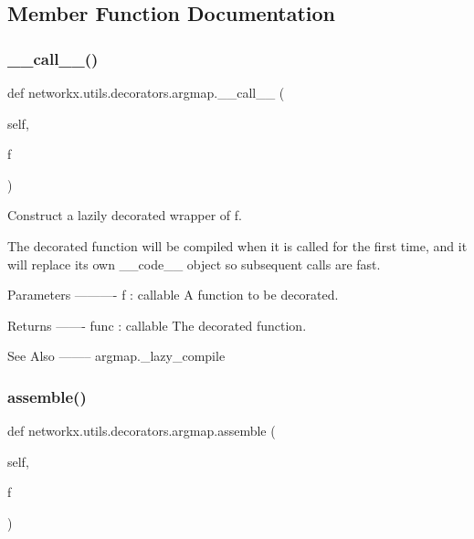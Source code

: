 \subsection{Member Function Documentation}
\mbox{\label{classnetworkx_1_1utils_1_1decorators_1_1argmap_abaf304b244dda496203fcbd471fec103}} 
\subsubsection{\texorpdfstring{\+\_\+\+\_\+call\+\_\+\+\_\+()}{\_\_call\_\_()}}
{\footnotesize\ttfamily def networkx.\+utils.\+decorators.\+argmap.\+\_\+\+\_\+call\+\_\+\+\_\+ (\begin{DoxyParamCaption}\item[{}]{self,  }\item[{}]{f }\end{DoxyParamCaption})}

\begin{DoxyVerb}Construct a lazily decorated wrapper of f.

The decorated function will be compiled when it is called for the first time,
and it will replace its own __code__ object so subsequent calls are fast.

Parameters
----------
f : callable
    A function to be decorated.

Returns
-------
func : callable
    The decorated function.

See Also
--------
argmap._lazy_compile
\end{DoxyVerb}
 \mbox{\label{classnetworkx_1_1utils_1_1decorators_1_1argmap_a22a7a6a3b8f4b9f469061050ca1afc20}} 
\subsubsection{\texorpdfstring{assemble()}{assemble()}}
{\footnotesize\ttfamily def networkx.\+utils.\+decorators.\+argmap.\+assemble (\begin{DoxyParamCaption}\item[{}]{self,  }\item[{}]{f }\end{DoxyParamCaption})}

